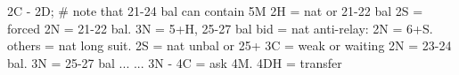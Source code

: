2C - 2D;
# note that 21-24 bal can contain 5M
2H = nat or 21-22 bal
    2S = forced
        2N = 21-22 bal. 3N = 5+H, 25-27 bal
        bid = nat
    anti-relay: 2N = 6+S. others = nat long suit.
2S = nat unbal or 25+
    3C = weak or waiting
2N = 23-24 bal. 3N = 25-27 bal ...
    ... 3N - 4C = ask 4M. 4DH = transfer
